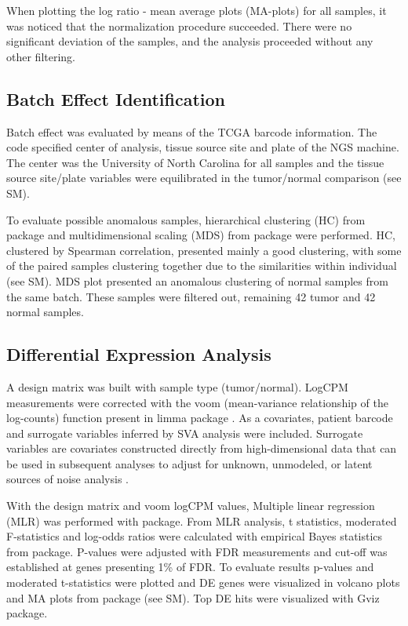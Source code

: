 \documentclass[9pt,twocolumn,twoside]{gsajnl}
\begin{document}
When plotting the log ratio - mean average plots (MA-plots) for all samples, it was noticed that the normalization procedure succeeded. There were no significant deviation of the samples, and the analysis proceeded without any other filtering.

\subsection*{Batch Effect Identification}

Batch effect was evaluated by means of the TCGA barcode information. The code specified center of analysis, tissue source site and plate of the NGS machine. The center was the University of North Carolina for all samples and the tissue source site/plate variables were equilibrated in the tumor/normal comparison (see SM).

To evaluate possible anomalous samples, hierarchical clustering (HC) from \cite{pheatmap} package and multidimensional scaling (MDS) from \cite{limma} package were performed. HC, clustered by Spearman correlation, presented mainly a good clustering, with some of the paired samples clustering together due to the similarities within individual (see SM). MDS plot presented an anomalous clustering of normal samples from the same batch. These samples were filtered out, remaining 42 tumor and 42 normal samples.


\subsection*{Differential Expression Analysis}

A design matrix was built with sample type (tumor/normal). LogCPM measurements were corrected with the  voom (mean-variance relationship of the log-counts) function present in limma package \cite{voom}. As a covariates,  patient barcode and surrogate variables inferred by SVA analysis were included. Surrogate variables are covariates constructed directly from high-dimensional data that can be used in subsequent analyses to adjust for unknown, unmodeled, or latent sources of noise analysis \cite{GSVA}.

With the design matrix and voom logCPM values, Multiple linear regression (MLR) was performed with \cite{limma} package. From MLR analysis, t statistics, moderated F-statistics and  log-odds ratios were calculated with empirical Bayes statistics from \cite{limma} package. P-values were adjusted with FDR measurements and cut-off was established at genes presenting 1\% of FDR. To evaluate results p-values and moderated t-statistics were plotted and DE genes were visualized in volcano plots and  MA plots  from \cite{limma} package (see SM). Top DE hits were visualized with Gviz package.
\end{document}

